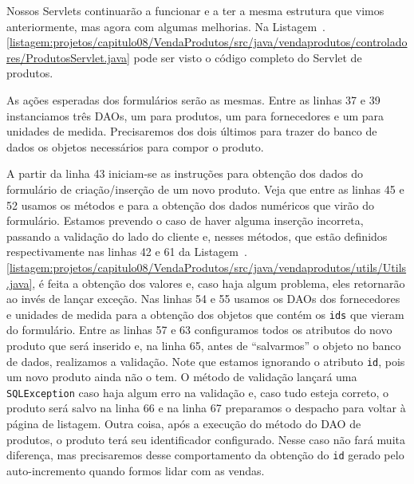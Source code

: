 Nossos Servlets continuarão a funcionar e a ter a mesma estrutura que vimos anteriormente, mas agora com algumas melhorias. Na Listagem~\thechapter.\ref{listagem:projetos/capitulo08/VendaProdutos/src/java/vendaprodutos/controladores/ProdutosServlet.java} pode ser visto o código completo do Servlet de produtos.


As ações esperadas dos formulários serão as mesmas. Entre as linhas 37 e 39 instanciamos três DAOs, um para produtos, um para fornecedores e um para unidades de medida. Precisaremos dos dois últimos para trazer do banco de dados os objetos necessários para compor o produto.

A partir da linha 43 iniciam-se as instruções para obtenção dos dados do formulário de criação/inserção de um novo produto. Veja que entre as linhas 45 e 52 usamos os métodos  e  para a obtenção dos dados numéricos que virão do formulário. Estamos prevendo o caso de haver alguma inserção incorreta, passando a validação do lado do cliente e, nesses métodos, que estão definidos respectivamente nas linhas 42 e 61 da Listagem~\thechapter.\ref{listagem:projetos/capitulo08/VendaProdutos/src/java/vendaprodutos/utils/Utils.java}, é feita a obtenção dos valores e, caso haja algum problema, eles retornarão  ao invés de lançar exceção. Nas linhas 54 e 55 usamos os DAOs dos fornecedores e unidades de medida para a obtenção dos objetos que contém os \texttt{ids} que vieram do formulário. Entre as linhas 57 e 63 configuramos todos os atributos do novo produto que será inserido e, na linha 65, antes de ``salvarmos'' o objeto no banco de dados, realizamos a validação. Note que estamos ignorando o atributo \texttt{id}, pois um novo produto ainda não o tem. O método de validação lançará uma \texttt{SQLException} caso haja algum erro na validação e, caso tudo esteja correto, o produto será salvo na linha 66 e na linha 67 preparamos o despacho para voltar à página de listagem. Outra coisa, após a execução do método  do DAO de produtos, o produto terá seu identificador configurado. Nesse caso não fará muita diferença, mas precisaremos desse comportamento da obtenção do \texttt{id} gerado pelo auto-incremento quando formos lidar com as vendas.

